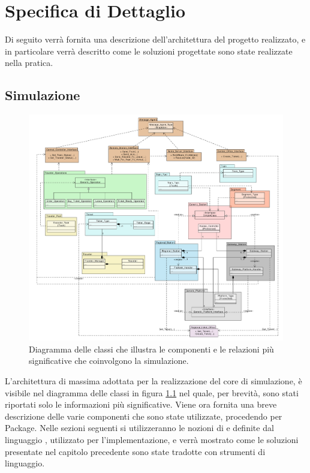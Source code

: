 \newpage
\chapter {Specifica di Dettaglio}

Di seguito verrà fornita una descrizione dell'architettura del progetto realizzato, e in particolare verrà descritto come le soluzioni progettate sono state realizzate nella pratica.

\section{Simulazione}

	\begin{figure}[htbp]
		\includegraphics[scale=0.39,trim= 100mm 0mm 0mm 0mm]{imgs/Simplified_Class_Diagram.pdf}
		\caption{\footnotesize{Diagramma delle classi che illustra le componenti e le relazioni più significative che coinvolgono la simulazione.}}
		\label{img:class_diagram}
	\end{figure}

L'architettura di massima adottata per la realizzazione del core di simulazione, è visibile nel diagramma delle classi in figura \ref{img:class_diagram} nel quale, per brevità, sono stati riportati solo le informazioni più significative.
	Viene ora fornita una breve descrizione delle varie componenti che sono state utilizzate, procedendo per Package. Nelle sezioni seguenti si utilizzeranno le nozioni di  e  definite dal linguaggio , utilizzato per l'implementazione, e verrà mostrato come le soluzioni presentate nel capitolo precedente sono state tradotte con strumenti di linguaggio.

